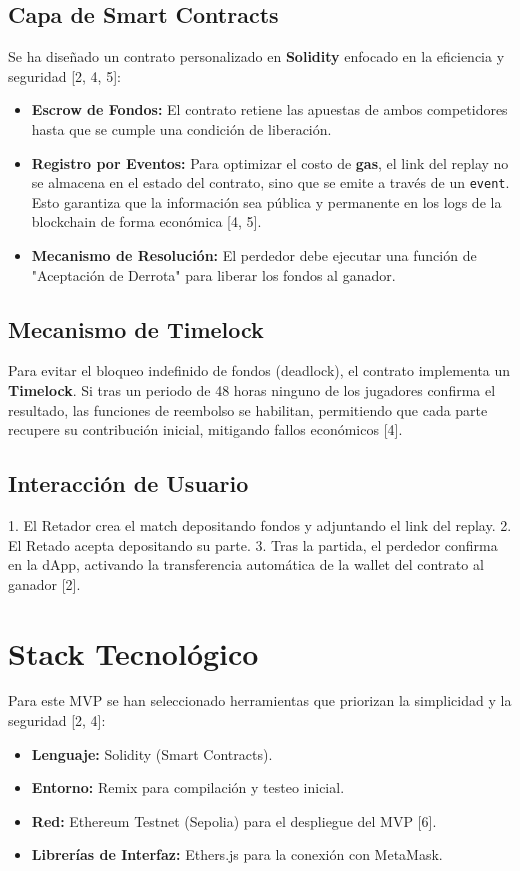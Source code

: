 \documentclass[twocolumn, 10pt]{article}
\begin{document}
\subsection{Capa de Smart Contracts}
Se ha diseñado un contrato personalizado en \textbf{Solidity} enfocado en la eficiencia y seguridad [2, 4, 5]:
\begin{itemize}
    \item \textbf{Escrow de Fondos:} El contrato retiene las apuestas de ambos competidores hasta que se cumple una condición de liberación.
    \item \textbf{Registro por Eventos:} Para optimizar el costo de \textbf{gas}, el link del replay no se almacena en el estado del contrato, sino que se emite a través de un \texttt{event}. Esto garantiza que la información sea pública y permanente en los logs de la blockchain de forma económica [4, 5].
    \item \textbf{Mecanismo de Resolución:} El perdedor debe ejecutar una función de "Aceptación de Derrota" para liberar los fondos al ganador.
\end{itemize}

\subsection{Mecanismo de Timelock}
Para evitar el bloqueo indefinido de fondos (deadlock), el contrato implementa un \textbf{Timelock}. Si tras un periodo de 48 horas ninguno de los jugadores confirma el resultado, las funciones de reembolso se habilitan, permitiendo que cada parte recupere su contribución inicial, mitigando fallos económicos [4].

\subsection{Interacción de Usuario}
1. El Retador crea el match depositando fondos y adjuntando el link del replay.
2. El Retado acepta depositando su parte.
3. Tras la partida, el perdedor confirma en la dApp, activando la transferencia automática de la wallet del contrato al ganador [2].

\section{Stack Tecnológico}
Para este MVP se han seleccionado herramientas que priorizan la simplicidad y la seguridad [2, 4]:
\begin{itemize}
    \item \textbf{Lenguaje:} Solidity (Smart Contracts).
    \item \textbf{Entorno:} Remix para compilación y testeo inicial.
    \item \textbf{Red:} Ethereum Testnet (Sepolia) para el despliegue del MVP [6].
    \item \textbf{Librerías de Interfaz:} Ethers.js para la conexión con MetaMask.
\end{itemize}
\end{document}
